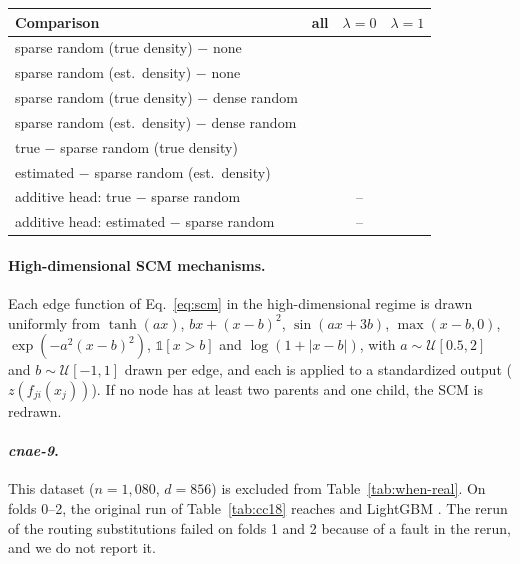 \documentclass[anon,12pt]{clear2027} %
\begin{document}
\begin{center}
\small
\begin{tabular}{@{}lccc@{}}
\toprule
Comparison & all & $\lambda=0$ & $\lambda=1$ \\
\midrule
sparse random (true density) $-$ none & \SynHighRandTrueNone{} & \SynHighRandTrueNoneLamZero{} & \SynHighRandTrueNoneLamOne{} \\
sparse random (est.\ density) $-$ none & \SynHighRandEstNone{} & \SynHighRandEstNoneLamZero{} & \SynHighRandEstNoneLamOne{} \\
sparse random (true density) $-$ dense random & \SynHighRandTrueRandom{} & \SynHighRandTrueRandomLamZero{} & \SynHighRandTrueRandomLamOne{} \\
sparse random (est.\ density) $-$ dense random & \SynHighRandEstRandom{} & \SynHighRandEstRandomLamZero{} & \SynHighRandEstRandomLamOne{} \\
true $-$ sparse random (true density) & \SynHighTrueRandTrue{} & \SynHighTrueRandTrueLamZero{} & \SynHighTrueRandTrueLamOne{} \\
estimated $-$ sparse random (est.\ density) & \SynHighEstRandEst{} & \SynHighEstRandEstLamZero{} & \SynHighEstRandEstLamOne{} \\
additive head: true $-$ sparse random & \SynHighAddTrueRandTrue{} & -- & \SynHighAddTrueRandTrueLamOne{} \\
additive head: estimated $-$ sparse random & \SynHighAddEstRandEst{} & -- & \SynHighAddEstRandEstLamOne{} \\
\bottomrule
\end{tabular}
\end{center}

\paragraph{High-dimensional SCM mechanisms.}
Each edge function of Eq.~\eqref{eq:scm} in the high-dimensional regime is drawn uniformly from $\tanh(ax)$, $bx+(x-b)^2$, $\sin(ax+3b)$, $\max(x-b,0)$, $\exp(-a^2(x-b)^2)$, $\mathbb 1[x>b]$ and $\log(1+|x-b|)$, with $a\sim\mathcal U[0.5,2]$ and $b\sim\mathcal U[-1,1]$ drawn per edge, and each is applied to a standardized output ($z(f_{ji}(x_j))$). If no node has at least two parents and one child, the SCM is redrawn.

\paragraph{\emph{cnae-9}.}\label{sec:when-cnae}
This dataset ($n=1{,}080$, $d=856$) is excluded from Table~\ref{tab:when-real}. On folds 0--2, the original run of Table~\ref{tab:cc18} reaches \CnaeOrig{} and LightGBM \CnaeLgbm{}. The rerun of the routing substitutions failed on folds 1 and 2 because of a fault in the rerun, and we do not report it.
\end{document}

